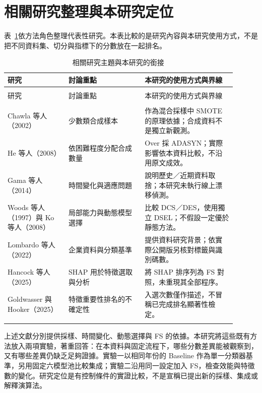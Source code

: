 \section{相關研究整理與本研究定位}

表~\ref{tab:lit-position}依方法角色整理代表性研究。本表比較的是研究內容與本研究使用方式，不是把不同資料集、切分與指標下的分數放在一起排名。

\begingroup\small{}\setlength{\tabcolsep}{4pt}
\begin{longtable}{@{}>{\raggedright\arraybackslash}p{0.24\linewidth}>{\raggedright\arraybackslash}p{0.30\linewidth}>{\raggedright\arraybackslash}p{0.36\linewidth}@{}}
\caption{相關研究主題與本研究的銜接}\label{tab:lit-position}\\
\toprule
研究 & 討論重點 & 本研究的使用方式與界線 \\
\midrule\endfirsthead
\multicolumn{3}{c}{表~\thetable（續）}\\\toprule
研究 & 討論重點 & 本研究的使用方式與界線 \\
\midrule\endhead
\midrule\multicolumn{3}{r}{續下頁}\\\endfoot
\bottomrule\endlastfoot
Chawla 等人（2002）\autocite{chawla2002smote} & 少數類合成樣本 & 作為混合採樣中 SMOTE 的原理依據；合成資料不是獨立新觀測。 \\[4pt]
He 等人（2008）\autocite{he2008adasyn} & 依困難程度分配合成數量 & Over 採 ADASYN；實際影響依本資料比較，不沿用原文成效。 \\[4pt]
Gama 等人（2014）\autocite{gama2014drift} & 時間變化與適應問題 & 說明歷史／近期資料取捨；本研究未執行線上漂移偵測。 \\[4pt]
Woods 等人（1997）與 Ko 等人（2008）\autocite{woods1997local,ko2008dynamic} & 局部能力與動態模型選擇 & 比較 DCS／DES，使用獨立 DSEL；不假設一定優於靜態方法。 \\[4pt]
Lombardo 等人（2022）\autocite{lombardo2022bankruptcy} & 企業資料與分類基準 & 提供資料研究背景；依實際公開版另核對標籤與識別碼數。 \\[4pt]
Hancock 等人（2025）\autocite{hancock2025shapfs} & SHAP 用於特徵選取與分析 & 將 SHAP 排序列為 FS 對照，未重現其全部程序。 \\[4pt]
Goldwasser 與 Hooker（2025）\autocite{goldwasser2025rankings} & 特徵重要性排名的不確定性 & 入選次數僅作描述，不冒稱已完成排名顯著性檢定。 \\*
\end{longtable}
\endgroup

上述文獻分別提供採樣、時間變化、動態選擇與 FS 的依據。本研究將這些既有方法放入兩項實驗，著重回答：在本資料與固定流程下，哪些分數差異能被觀察到，又有哪些差異仍缺乏足夠證據。實驗一以相同年份的 Baseline 作為單一分類器基準，另用固定六模型池比較集成；實驗二沿用同一設定加入 FS，檢查效能與特徵數的變化。研究定位是有控制條件的實證比較，不是宣稱已提出新的採樣、集成或解釋演算法。
\endgroup
